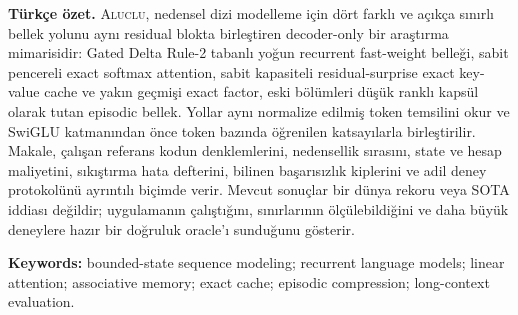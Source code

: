 \documentclass[11pt,a4paper]{article}
\newcommand{\ALUCLU}{\textsc{Aluclu}\xspace}
\begin{document}
\begin{center}
\begin{minipage}{0.94\textwidth}
\small
\textbf{Türkçe özet.}
\ALUCLU, nedensel dizi modelleme için dört farklı ve açıkça sınırlı bellek
yolunu aynı residual blokta birleştiren decoder-only bir araştırma
mimarisidir: Gated Delta Rule-2 tabanlı yoğun recurrent fast-weight belleği,
sabit pencereli exact softmax attention, sabit kapasiteli residual-surprise
exact key-value cache ve yakın geçmişi exact factor, eski bölümleri düşük
ranklı kapsül olarak tutan episodic bellek. Yollar aynı normalize edilmiş token
temsilini okur ve SwiGLU katmanından önce token bazında öğrenilen katsayılarla
birleştirilir. Makale, çalışan referans kodun denklemlerini, nedensellik
sırasını, state ve hesap maliyetini, sıkıştırma hata defterini, bilinen
başarısızlık kiplerini ve adil deney protokolünü ayrıntılı biçimde verir.
Mevcut sonuçlar bir dünya rekoru veya SOTA iddiası değildir; uygulamanın
çalıştığını, sınırlarının ölçülebildiğini ve daha büyük deneylere hazır bir
doğruluk oracle'ı sunduğunu gösterir.
\end{minipage}
\end{center}

\vspace{0.5em}
\noindent\textbf{Keywords:}
bounded-state sequence modeling; recurrent language models; linear attention;
associative memory; exact cache; episodic compression; long-context evaluation.

\clearpage
\tableofcontents
\clearpage













\clearpage


\end{document}
